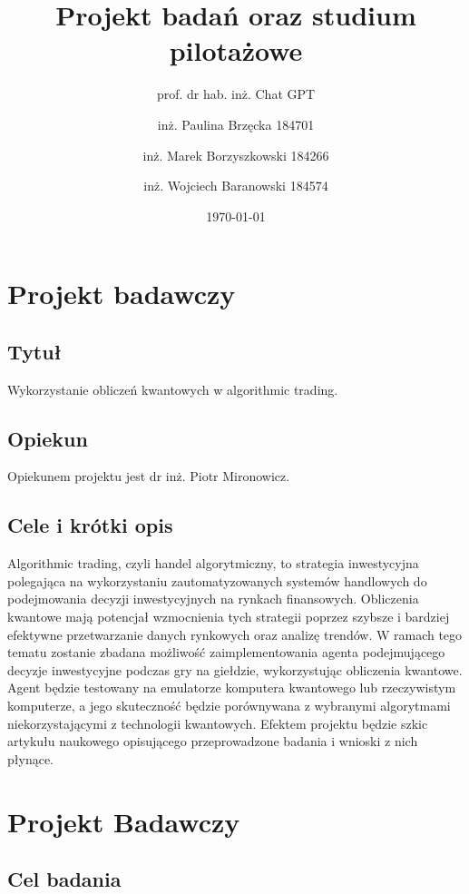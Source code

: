 \documentclass[polish,envcountsect,10pt]{article}
\title{Projekt badań oraz studium pilotażowe}
\author{prof. dr hab. inż. Chat GPT \and inż. Paulina Brzęcka 184701 \and inż. Marek Borzyszkowski 184266 \and inż. Wojciech Baranowski 184574}
\date{\today}
\begin{document}
\maketitle
\tableofcontents
\newpage

\section{Projekt badawczy}

\subsection{Tytuł}

Wykorzystanie obliczeń kwantowych w algorithmic trading.

\subsection{Opiekun}

Opiekunem projektu jest dr inż. Piotr Mironowicz.

\subsection{Cele i krótki opis}

Algorithmic trading, czyli handel algorytmiczny, to strategia inwestycyjna polegająca na wykorzystaniu zautomatyzowanych systemów handlowych do podejmowania decyzji inwestycyjnych na rynkach finansowych. Obliczenia kwantowe mają potencjał wzmocnienia tych strategii poprzez szybsze i bardziej efektywne przetwarzanie danych rynkowych oraz analizę trendów. W ramach tego tematu zostanie zbadana możliwość zaimplementowania agenta podejmującego decyzje inwestycyjne podczas gry na giełdzie, wykorzystując obliczenia kwantowe. Agent będzie testowany na emulatorze komputera kwantowego lub rzeczywistym komputerze, a jego skuteczność będzie porównywana z wybranymi algorytmami niekorzystającymi z technologii kwantowych. Efektem projektu będzie szkic artykułu naukowego opisującego przeprowadzone badania i wnioski z nich płynące.


\section{Projekt Badawczy}

\subsection{Cel badania}
\end{document}
